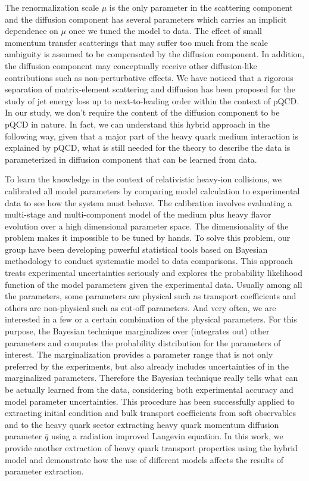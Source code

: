 \documentclass[aps, prc, reprint, amsmath, groupedaddress, nofootinbib]{revtex4-1}
\begin{document}
The renormalization scale $\mu$ is the only parameter in the scattering component and the diffusion component has several parameters which carries an implicit dependence on $\mu$ once we tuned the model to data.
The effect of small momentum transfer scatterings that may suffer too much from the scale ambiguity is assumed to be compensated by the diffusion component. 
In addition, the diffusion component may conceptually receive other diffusion-like contributions such as non-perturbative effects.
We have noticed that a rigorous separation of matrix-element scattering and diffusion has been proposed for the study of jet energy loss up to next-to-leading order within the context of pQCD.
In our study, we don't require the content of the diffusion component to be pQCD in nature.
In fact, we can understand this hybrid approach in the following way, given that a major part of the heavy quark medium interaction is explained by pQCD, what is still needed for the theory to describe the data is parameterized in diffusion component that can be learned from data.

To learn the knowledge in the context of relativistic heavy-ion collisions, we calibrated all model parameters by comparing model calculation to experimental data to see how the system must behave.
The calibration involves evaluating a multi-stage and multi-component model of the medium plus heavy flavor evolution over a high dimensional parameter space.
The dimensionality of the problem makes it impossible to be tuned by hands.
To solve this problem, our group have been developing powerful statistical tools based on Bayesian methodology to conduct systematic model to data comparisons.
This approach treats experimental uncertainties seriously and explores the probability likelihood function of the model parameters given the experimental data.
Usually among all the parameters, some parameters are physical such as transport coefficients and others are non-physical such as cut-off parameters. 
And very often, we are interested in a few or a certain combination of the physical parameters.
For this purpose, the Bayesian technique marginalizes over (integrates out) other parameters and computes the probability distribution for the parameters of interest. 
The marginalization provides a parameter range that is not only preferred by the experiments, but also already includes uncertainties of in the marginalized parameters.
Therefore the Bayesian technique really tells what can be actually learned from the data, considering both experimental accuracy and model parameter uncertainties.
This procedure has been successfully applied to extracting initial condition and bulk transport coefficients from soft observables and to the heavy quark sector extracting heavy quark momentum diffusion parameter $\hat{q}$ using a radiation improved Langevin equation.
In this work, we provide another extraction of heavy quark transport properties using the hybrid model and demonstrate how the use of different models affects the results of parameter extraction.
\end{document}

